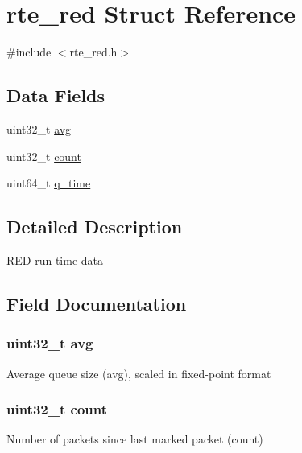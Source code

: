 \hypertarget{structrte__red}{}\section{rte\+\_\+red Struct Reference}
\label{structrte__red}


{\ttfamily \#include $<$rte\+\_\+red.\+h$>$}

\subsection*{Data Fields}
\begin{DoxyCompactItemize}
\item 
uint32\+\_\+t \hyperlink{structrte__red_ae71a157cc52be7c78ac77c8dfef9199b}{avg}
\item 
uint32\+\_\+t \hyperlink{structrte__red_a86988a65e0d3ece7990c032c159786d6}{count}
\item 
uint64\+\_\+t \hyperlink{structrte__red_a6de3a741e3ef25f5807a54792bbb3ac2}{q\+\_\+time}
\end{DoxyCompactItemize}


\subsection{Detailed Description}
R\+E\+D run-\/time data 

\subsection{Field Documentation}
\hypertarget{structrte__red_ae71a157cc52be7c78ac77c8dfef9199b}{}
\subsubsection[{avg}]{\setlength{\rightskip}{0pt plus 5cm}uint32\+\_\+t avg}\label{structrte__red_ae71a157cc52be7c78ac77c8dfef9199b}
Average queue size (avg), scaled in fixed-\/point format \hypertarget{structrte__red_a86988a65e0d3ece7990c032c159786d6}{}
\subsubsection[{count}]{\setlength{\rightskip}{0pt plus 5cm}uint32\+\_\+t count}\label{structrte__red_a86988a65e0d3ece7990c032c159786d6}
Number of packets since last marked packet (count) \hypertarget{structrte__red_a6de3a741e3ef25f5807a54792bbb3ac2}{}
